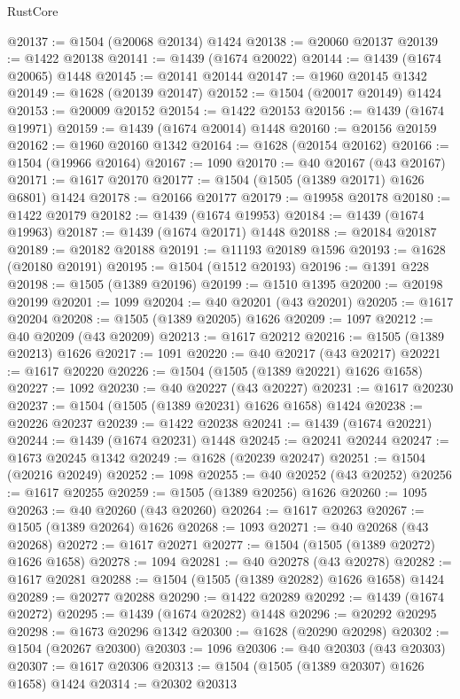 \begin{lexlean}{RustCore}
\begin{coremodule}
@20137 := @1504 (@20068 @20134) @1424
@20138 := @20060 @20137
@20139 := @1422 @20138
@20141 := @1439 (@1674 @20022)
@20144 := @1439 (@1674 @20065) @1448
@20145 := @20141 @20144
@20147 := @1960 @20145 @1342
@20149 := @1628 (@20139 @20147)
@20152 := @1504 (@20017 @20149) @1424
@20153 := @20009 @20152
@20154 := @1422 @20153
@20156 := @1439 (@1674 @19971)
@20159 := @1439 (@1674 @20014) @1448
@20160 := @20156 @20159
@20162 := @1960 @20160 @1342
@20164 := @1628 (@20154 @20162)
@20166 := @1504 (@19966 @20164)
@20167 := 1090
@20170 := @40 @20167 (@43 @20167)
@20171 := @1617 @20170
@20177 := @1504 (@1505 (@1389 @20171) @1626 @6801) @1424
@20178 := @20166 @20177
@20179 := @19958 @20178
@20180 := @1422 @20179
@20182 := @1439 (@1674 @19953)
@20184 := @1439 (@1674 @19963)
@20187 := @1439 (@1674 @20171) @1448
@20188 := @20184 @20187
@20189 := @20182 @20188
@20191 := @11193 @20189 @1596
@20193 := @1628 (@20180 @20191)
@20195 := @1504 (@1512 @20193)
@20196 := @1391 @228
@20198 := @1505 (@1389 @20196)
@20199 := @1510 @1395
@20200 := @20198 @20199
@20201 := 1099
@20204 := @40 @20201 (@43 @20201)
@20205 := @1617 @20204
@20208 := @1505 (@1389 @20205) @1626
@20209 := 1097
@20212 := @40 @20209 (@43 @20209)
@20213 := @1617 @20212
@20216 := @1505 (@1389 @20213) @1626
@20217 := 1091
@20220 := @40 @20217 (@43 @20217)
@20221 := @1617 @20220
@20226 := @1504 (@1505 (@1389 @20221) @1626 @1658)
@20227 := 1092
@20230 := @40 @20227 (@43 @20227)
@20231 := @1617 @20230
@20237 := @1504 (@1505 (@1389 @20231) @1626 @1658) @1424
@20238 := @20226 @20237
@20239 := @1422 @20238
@20241 := @1439 (@1674 @20221)
@20244 := @1439 (@1674 @20231) @1448
@20245 := @20241 @20244
@20247 := @1673 @20245 @1342
@20249 := @1628 (@20239 @20247)
@20251 := @1504 (@20216 @20249)
@20252 := 1098
@20255 := @40 @20252 (@43 @20252)
@20256 := @1617 @20255
@20259 := @1505 (@1389 @20256) @1626
@20260 := 1095
@20263 := @40 @20260 (@43 @20260)
@20264 := @1617 @20263
@20267 := @1505 (@1389 @20264) @1626
@20268 := 1093
@20271 := @40 @20268 (@43 @20268)
@20272 := @1617 @20271
@20277 := @1504 (@1505 (@1389 @20272) @1626 @1658)
@20278 := 1094
@20281 := @40 @20278 (@43 @20278)
@20282 := @1617 @20281
@20288 := @1504 (@1505 (@1389 @20282) @1626 @1658) @1424
@20289 := @20277 @20288
@20290 := @1422 @20289
@20292 := @1439 (@1674 @20272)
@20295 := @1439 (@1674 @20282) @1448
@20296 := @20292 @20295
@20298 := @1673 @20296 @1342
@20300 := @1628 (@20290 @20298)
@20302 := @1504 (@20267 @20300)
@20303 := 1096
@20306 := @40 @20303 (@43 @20303)
@20307 := @1617 @20306
@20313 := @1504 (@1505 (@1389 @20307) @1626 @1658) @1424
@20314 := @20302 @20313

\end{coremodule}
\end{lexlean}

